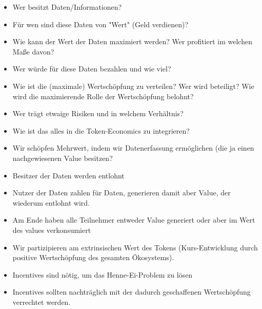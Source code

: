 \begin{Praemisse}

\vspace{0.2cm}


\vspace{0.2cm}

\begin{itemize}
  \item Wer besitzt Daten/Informationen?
  \item Für wen sind diese Daten von "Wert" (Geld verdienen)?
  \item Wie kann der Wert der Daten maximiert werden? Wer profitiert im welchen Maße davon?
  \item Wer würde für diese Daten bezahlen und wie viel?
  \item Wie ist die (maximale) Wertschöpfung zu verteilen? Wer wird beteiligt? Wie wird die maximierende Rolle der Wertschöpfung belohnt?
  \item Wer trägt etwaige Risiken und in welchem Verhältnis?
  \item Wie ist das alles in die Token-Economics zu integrieren? 
\end{itemize}

\end{Praemisse}


\vspace{0.3cm}

\begin{Fazit}

\begin{itemize}
  \item Wir schöpfen Mehrwert, indem wir Datenerfassung ermöglichen (die ja einen nachgewiesenen Value besitzen?
  \item Besitzer der Daten werden entlohnt
  \item Nutzer der Daten zahlen für Daten, generieren damit aber Value, der wiederum entlohnt wird.
  \item Am Ende haben alle Teilnehmer entweder Value generiert oder aber im Wert des values verkonsumiert
  \item Wir partizipieren am extrinsischen Wert des Tokens (Kurs-Entwicklung durch positive Wertschöpfung des gesamten Ökosystems).
  \item Incentives sind nötig, um das Henne-Ei-Problem zu lösen
  \item Incentives sollten nachträglich mit der dadurch geschaffenen Wertschöpfung verrechtet werden. 
\end{itemize}

\end{Fazit}

